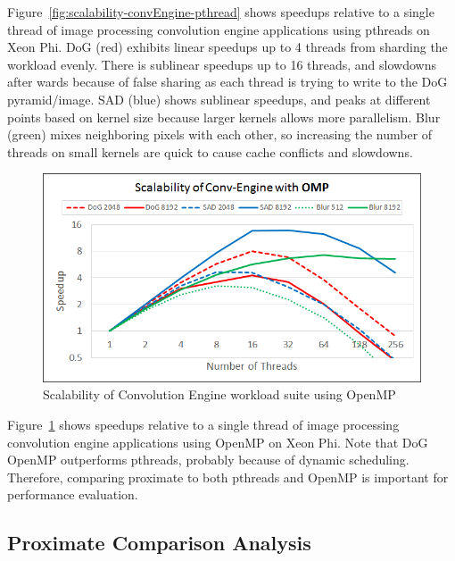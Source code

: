 Figure~\ref{fig:scalability-convEngine-pthread} shows speedups relative to a 
single thread of image processing convolution engine applications using pthreads 
on Xeon Phi. DoG (red) exhibits linear speedups up to 4 threads from sharding 
the workload evenly. There is sublinear speedups up to 16 threads, and slowdowns 
after wards because of false sharing as each thread is trying to write to the DoG 
pyramid/image. SAD (blue) shows sublinear speedups, and peaks at different 
points based on kernel size because larger kernels allows more parallelism. Blur 
(green) mixes neighboring pixels with each other, so increasing the number of 
threads on small kernels are quick to cause cache conflicts and slowdowns. 


\begin{figure}[h]
  \begin{center}
    \includegraphics[width=\linewidth]{cs758-figs/scalability-convEngine-omp.png}
  \end{center}
\vspace{-0.2in}
  \caption{Scalability of Convolution Engine workload suite using OpenMP}
  \label{fig:scalability-convEngine-omp}
\vspace{-0.05in}
\end{figure}

Figure~\ref{fig:scalability-convEngine-omp} shows speedups relative to a single 
thread of image processing convolution engine applications using OpenMP on Xeon 
Phi. Note that DoG OpenMP outperforms pthreads, probably because of dynamic 
scheduling. Therefore, comparing proximate to both pthreads and OpenMP is 
important for performance evaluation. 

\subsection{Proximate Comparison Analysis}

